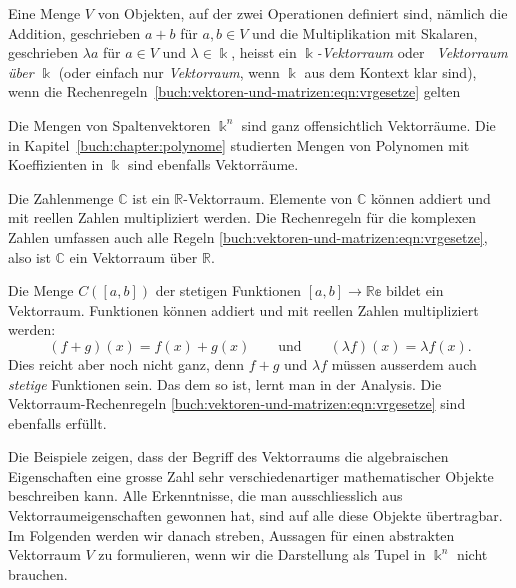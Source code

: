 \begin{definition}
Eine Menge $V$ von Objekten, auf der zwei Operationen definiert sind,
nämlich die Addition, geschrieben $a+b$ für $a,b\in V$ und die
Multiplikation mit Skalaren, geschrieben $\lambda a$ für $a\in V$ und
$\lambda\in \Bbbk$, heisst ein {\em $\Bbbk$-Vektorraum} oder {\em Vektorraum
über $\Bbbk$} (oder
einfach nur {\em Vektorraum}, wenn $\Bbbk$ aus dem Kontext klar sind),
wenn die Rechenregeln~\eqref{buch:vektoren-und-matrizen:eqn:vrgesetze}
gelten
%
%
\end{definition}

Die Mengen von Spaltenvektoren $\Bbbk^n$ sind ganz offensichtlich
Vektorräume.
Die in Kapitel~\ref{buch:chapter:polynome} studierten Mengen von
Polynomen mit Koeffizienten in $\Bbbk$ sind ebenfalls Vektorräume.

\begin{beispiel}
Die Zahlenmenge $\mathbb{C}$ ist ein $\mathbb{R}$-Vektorraum.
%
Elemente von $\mathbb{C}$ können addiert und mit reellen Zahlen
multipliziert werden.
Die Rechenregeln für die komplexen Zahlen umfassen auch alle Regeln
\eqref{buch:vektoren-und-matrizen:eqn:vrgesetze}, also ist
$\mathbb{C}$ ein Vektorraum über $\mathbb{R}$.
\end{beispiel}

\begin{beispiel}
Die Menge $C([a,b])$ der stetigen Funktionen $[a,b]\to\mathbb{Re}$
bildet ein Vektorraum.
%
Funktionen können addiert und mit reellen Zahlen multipliziert werden:
\[
(f+g)(x) = f(x) + g(x)
\qquad\text{und}\qquad
(\lambda f)(x) = \lambda f(x).
\]
Dies reicht aber noch nicht ganz, denn $f+g$ und $\lambda f$ müssen
ausserdem auch {\em stetige} Funktionen sein.
Das dem so ist, lernt man in der Analysis.
Die Vektorraum-Rechenregeln
\eqref{buch:vektoren-und-matrizen:eqn:vrgesetze} sind ebenfalls erfüllt.
\end{beispiel}

Die Beispiele zeigen, dass der Begriff des Vektorraums die algebraischen
Eigenschaften eine grosse Zahl sehr verschiedenartiger mathematischer
Objekte beschreiben kann.
Alle Erkenntnisse, die man ausschliesslich aus Vektorraumeigenschaften
gewonnen hat, sind auf alle diese Objekte übertragbar.
Im Folgenden werden wir danach streben, Aussagen für einen 
abstrakten Vektorraum $V$ zu formulieren,
wenn wir die Darstellung als Tupel in $\Bbbk^n$ nicht brauchen.

